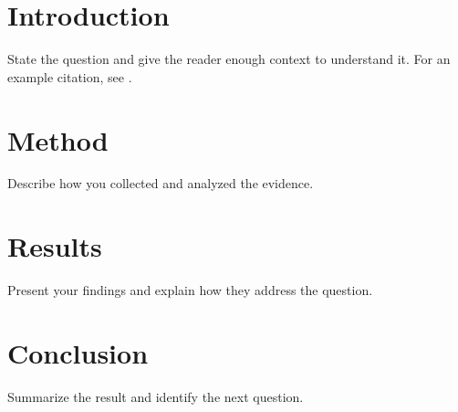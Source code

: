 \documentclass[11pt]{article}
\title{\detokenize{__PROJECT_NAME__}}
\author{Your Name}
\date{\today}
\begin{document}
\maketitle

\begin{abstract}
Summarize your question, method, and main result in one paragraph.
\end{abstract}

\section{Introduction}
State the question and give the reader enough context to understand it.
For an example citation, see \cite{knuth1984}.

\section{Method}
Describe how you collected and analyzed the evidence.

\section{Results}
Present your findings and explain how they address the question.

\section{Conclusion}
Summarize the result and identify the next question.



\end{document}
